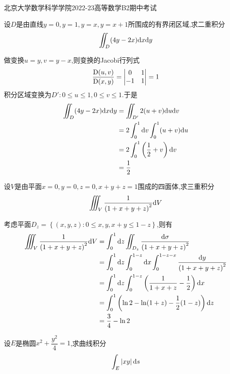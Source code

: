 \documentclass{ctexart}
\begin{document}
\pagestyle{empty}
\begin{center}\Large
    北京大学数学科学学院2022-23高等数学B2期中考试
\end{center}
\begin{problem}[1.(10\songti{分})]
    设$D$是由直线$y=0,y=1,y=x,y=x+1$所围成的有界闭区域,求二重积分
    \[\iint_D(4y-2x)\mathrm{d} x\mathrm{d} y\]

\end{problem}
\begin{solution}
    做变换$u=y,v=y-x$,则变换的Jacobi行列式
    \[\dfrac{\text D(u,v)}{\text D(x,y)}=\begin{vmatrix}
        0&1\\-1&1
    \end{vmatrix}=1\]
    积分区域变换为$D':0\leqslant u\leqslant 1,0\leqslant v\leqslant 1$.于是
    \[\begin{aligned}
        \iint_D(4y-2x)\mathrm{d} x\mathrm{d} y
        &= \iint_{D'}2(u+v)\mathrm{d} u\mathrm{d} v \\
        &= 2\int_0^1\mathrm{d} v\int_0^1(u+v)\mathrm{d} u \\
        &= 2\int_0^1\left(\dfrac12+v\right)\mathrm{d} v \\
        &= \dfrac12
    \end{aligned}\]
\end{solution}
\begin{problem}[2.(10\songti{分})]
    设$V$是由平面$x=0,y=0,z=0,x+y+z=1$围成的四面体,求三重积分
    \[\iiint_V\dfrac{1}{\left(1+x+y+z\right)^2}\mathrm{d} V\]
    
\end{problem}
\begin{solution}
    考虑平面$D_z=\left\{(x,y,z):0\leqslant x,y,x+y\leqslant 1-z\right\}$,则有
    \[\begin{aligned}
        \iiint_V\dfrac{1}{\left(1+x+y+z\right)^2}\mathrm{d} V
        &= \int_0^1\mathrm{d} z\iint_{D_z}\dfrac{\mathrm{d}\sigma}{\left(1+x+y+z\right)^2} \\
        &= \int_0^1\mathrm{d} z\int_0^{1-z}\mathrm{d} x\int_0^{1-z-x}\dfrac{\mathrm{d} y}{\left(1+x+y+z\right)^2} \\
        &= \int_0^1\mathrm{d} z\int_0^{1-z}\left(\dfrac{1}{1+x+z}-\dfrac12\right)\mathrm{d} x \\
        &= \int_0^1\left(\ln 2-\ln(1+z)-\dfrac12(1-z)\right)\mathrm{d} z \\
        &= \dfrac34-\ln2
    \end{aligned}\]

\end{solution}
\begin{problem}[3.(10\songti{分})]
    设$E$是椭圆$x^2+\dfrac{y^2}{4}=1$,求曲线积分
    \[\int_E\left|xy\right|\mathrm{d} s\]

\end{problem}
\end{document}
